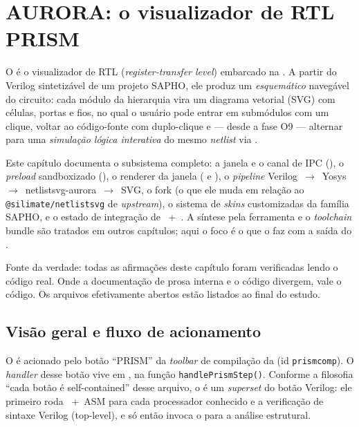 \chapter{AURORA: o visualizador de RTL PRISM}
\label{cap:11-aurora-prism-rtl}

O  é o visualizador de RTL (\emph{register-transfer level}) embarcado
na . A partir do Verilog sintetizável de um projeto SAPHO, ele
produz um \emph{esquemático} navegável do circuito: cada módulo da hierarquia
vira um diagrama vetorial (SVG) com células, portas e fios, no qual o usuário
pode entrar em submódulos com um clique, voltar ao código-fonte com duplo-clique
e --- desde a fase O9 --- alternar para uma \emph{simulação lógica interativa}
do mesmo \emph{netlist} via .

Este capítulo documenta o subsistema completo: a janela e o canal de IPC
(), o \emph{preload} sandboxizado
(), o renderer da janela
( e ), o \emph{pipeline}
Verilog~$\rightarrow$~Yosys~$\rightarrow$~netlistsvg-aurora~$\rightarrow$~SVG, o
fork  (o que ele muda em relação ao
\lstinline|@silimate/netlistsvg| de \emph{upstream}), o sistema de \emph{skins}
customizadas da família SAPHO, e o estado de integração de
~+~. A síntese pela ferramenta 
e o \emph{toolchain} bundle são tratados em outros capítulos; aqui o foco é o que
o  faz com a saída do .

\begin{nota}
Fonte da verdade: todas as afirmações deste capítulo foram verificadas lendo o
código real. Onde a documentação de prosa interna e o código divergem, vale o
código. Os arquivos efetivamente abertos estão listados ao final do estudo.
\end{nota}

\section{Visão geral e fluxo de acionamento}

O  é acionado pelo botão \enquote{PRISM} da \emph{toolbar} de
compilação da  (id \lstinline|prismcomp|). O \emph{handler} desse
botão vive em , na função
\lstinline|handlePrismStep()|. Conforme a filosofia \enquote{cada botão é
self-contained} desse arquivo, o  é um \emph{superset} do botão
Verilog: ele primeiro roda \cmm{}~+~ASM para cada processador conhecido e a
verificação de sintaxe Verilog (top-level), e só então invoca o 
para a análise estrutural.

